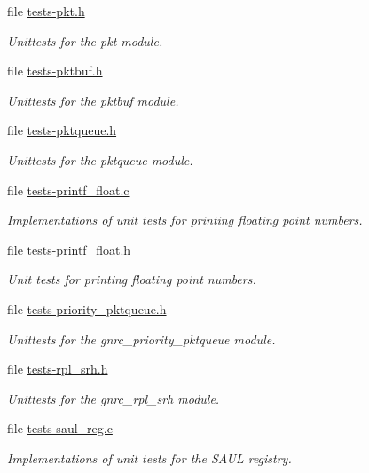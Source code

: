\begin{DoxyCompactItemize}
file \hyperlink{tests-pkt_8h}{tests-\/pkt.\+h}
\begin{DoxyCompactList}\small\item\em Unittests for the {\ttfamily pkt} module. \end{DoxyCompactList}\item 
file \hyperlink{tests-pktbuf_8h}{tests-\/pktbuf.\+h}
\begin{DoxyCompactList}\small\item\em Unittests for the {\ttfamily pktbuf} module. \end{DoxyCompactList}\item 
file \hyperlink{tests-pktqueue_8h}{tests-\/pktqueue.\+h}
\begin{DoxyCompactList}\small\item\em Unittests for the {\ttfamily pktqueue} module. \end{DoxyCompactList}\item 
file \hyperlink{tests-printf__float_8c}{tests-\/printf\+\_\+float.\+c}
\begin{DoxyCompactList}\small\item\em Implementations of unit tests for printing floating point numbers. \end{DoxyCompactList}\item 
file \hyperlink{tests-printf__float_8h}{tests-\/printf\+\_\+float.\+h}
\begin{DoxyCompactList}\small\item\em Unit tests for printing floating point numbers. \end{DoxyCompactList}\item 
file \hyperlink{tests-priority__pktqueue_8h}{tests-\/priority\+\_\+pktqueue.\+h}
\begin{DoxyCompactList}\small\item\em Unittests for the {\ttfamily gnrc\+\_\+priority\+\_\+pktqueue} module. \end{DoxyCompactList}\item 
file \hyperlink{tests-rpl__srh_8h}{tests-\/rpl\+\_\+srh.\+h}
\begin{DoxyCompactList}\small\item\em Unittests for the {\ttfamily gnrc\+\_\+rpl\+\_\+srh} module. \end{DoxyCompactList}\item 
file \hyperlink{tests-saul__reg_8c}{tests-\/saul\+\_\+reg.\+c}
\begin{DoxyCompactList}\small\item\em Implementations of unit tests for the S\+A\+UL registry. \end{DoxyCompactList}\item 

\end{DoxyCompactItemize}
